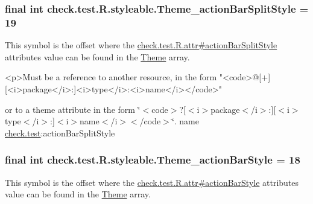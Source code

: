 \subsubsection[{Theme\+\_\+action\+Bar\+Split\+Style}]{\setlength{\rightskip}{0pt plus 5cm}final int check.\+test.\+R.\+styleable.\+Theme\+\_\+action\+Bar\+Split\+Style = 19\hspace{0.3cm}{\ttfamily [static]}}\label{classcheck_1_1test_1_1_r_1_1styleable_a9f5d8b45ed85a61b92f887aa336f3adf}
This symbol is the offset where the \hyperlink{classcheck_1_1test_1_1_r_1_1attr_a6557ab4a25c517d04661c987b9ddd3ef}{check.\+test.\+R.\+attr\#action\+Bar\+Split\+Style} attribute\textquotesingle{}s value can be found in the \hyperlink{classcheck_1_1test_1_1_r_1_1styleable_acca726d02016a0cf607782ec3a436a81}{Theme} array.

\begin{DoxyVerb}      <p>Must be a reference to another resource, in the form "<code>@[+][<i>package</i>:]<i>type</i>:<i>name</i></code>"
\end{DoxyVerb}
 or to a theme attribute in the form \char`\"{}$<$code$>$?\mbox{[}$<$i$>$package$<$/i$>$\+:\mbox{]}\mbox{[}$<$i$>$type$<$/i$>$\+:\mbox{]}$<$i$>$name$<$/i$>$$<$/code$>$\char`\"{}.  name \hyperlink{namespacecheck_1_1test}{check.\+test}\+:action\+Bar\+Split\+Style \hypertarget{classcheck_1_1test_1_1_r_1_1styleable_a08cd7000f459aa75d7817e7a3a7c3229}{}
\subsubsection[{Theme\+\_\+action\+Bar\+Style}]{\setlength{\rightskip}{0pt plus 5cm}final int check.\+test.\+R.\+styleable.\+Theme\+\_\+action\+Bar\+Style = 18\hspace{0.3cm}{\ttfamily [static]}}\label{classcheck_1_1test_1_1_r_1_1styleable_a08cd7000f459aa75d7817e7a3a7c3229}
This symbol is the offset where the \hyperlink{classcheck_1_1test_1_1_r_1_1attr_a10ba248fd78f9255e076be391a8965c7}{check.\+test.\+R.\+attr\#action\+Bar\+Style} attribute\textquotesingle{}s value can be found in the \hyperlink{classcheck_1_1test_1_1_r_1_1styleable_acca726d02016a0cf607782ec3a436a81}{Theme} array.

